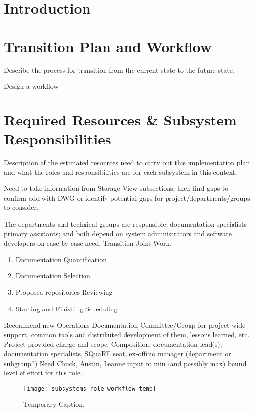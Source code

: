 \section{Introduction}

\section{Transition Plan and Workflow}

Describe the process for transition from the current state to the future state.

Design a workflow

\section{Required Resources \& Subsystem Responsibilities}

Description of the estimated resources need to carry out this implementation plan and what the roles and responsibilities are for each subsystem in this context.

Need to take information from Storage View subsections, then find gaps to confirm add with DWG or identify potential gaps for project/departments/groups to consider.

The departments and technical groups are responsible; documentation specialists primary assistants; and both depend on system administrators and software developers on case-by-case need.
Transition Joint Work.

\begin{enumerate}
        \item Documentation Quantification
        \item Documentation Selection
        \item Proposed repositories Reviewing
        \item Starting and Finishing Scheduling
\end{enumerate}

Recommend new Operations Documentation Committee/Group for project-wide support, common tools and distributed development of them, lessons learned, etc.
Project-provided charge and scope.
Composition: documentation lead(s), documentation specialists, SQuaRE seat, ex-officio manager (department or subgroup?)
Need Chuck, Austin, Leanne input to min (and possibly max) bound level of effort for this role.

\begin{figure}[t]
\caption{Temporary Caption.}
\centering
\texttt{[image: subsystems-role-workflow-temp]}
\label{fig:subsystems-role-workflow}
\end{figure}

